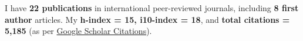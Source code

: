 \hfill
\par
I have \textbf{22 publications} in international peer-reviewed journals, including \textbf{8 first author} articles. My \textbf{h-index = 15, i10-index = 18}, and \textbf{total citations = 5,185} (as per \href{https://scholar.google.com/citations?hl=en&user=6-7FYjIAAAAJ&authuser=2}{Google Scholar Citations}).

\nocite{*}


\printbibliography[heading={none},title={Published},type=article]



